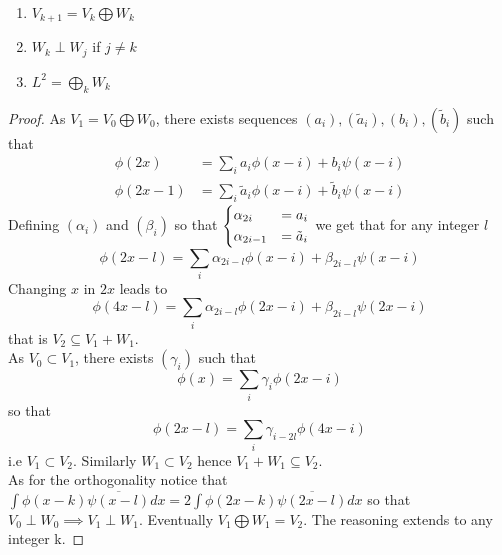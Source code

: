 \documentclass[a4paper, 11pt]{article}
\begin{document}
\begin{prop}{1}
  \begin{enumerate}
    \item $V_{k+1} = V_k \bigoplus W_k$
    \item $W_k \perp W_j$ if $j\neq k$
    \item $L^2 = \bigoplus_{k} W_k$ 
  \end{enumerate}
\end{prop}

\begin{proof}
  As $V_1 = V_0 \bigoplus W_0$, there exists sequences $(a_i), (\tilde{a}_i), (b_i), (\tilde{b}_i)$ such that
  \begin{align*}
    \phi(2x) &= \sum_{i} a_i \phi(x-i) + b_i \psi(x-i) \\
    \phi(2x-1) &= \sum_{i} \tilde{a}_i \phi(x-i) + \tilde{b}_i \psi(x-i)
  \end{align*}
  Defining $(\alpha_i)$ and $(\beta_i)$ so that $\begin{dcases} \alpha_{2i} &= a_{i} \\ \alpha_{2i-1} &= \tilde{a}_i 
  \end{dcases}$ we get that for any integer $l$
  \begin{equation}
    \phi(2x-l) = \sum_{i} \alpha_{2i-l} \phi(x-i) + \beta_{2i-l} \psi(x-i)
  \end{equation}
  Changing $x$ in $2x$ leads to 
  \begin{equation}
    \phi(4x-l) = \sum_{i} \alpha_{2i-l} \phi(2x-i) + \beta_{2i-l} \psi(2x-i)
  \end{equation}
  that is $V_2 \subseteq V_1 + W_1$. \\

  As $V_0 \subset V_1$, there exists $(\gamma_i)$ such that 
  \begin{equation*}
    \phi(x) = \sum_i \gamma_i \phi(2x-i)
  \end{equation*}
  so that 
  \begin{equation*}
    \phi(2x-l) = \sum_i \gamma_{i-2l} \phi(4x-i)
  \end{equation*}
  i.e $V_1 \subset V_2$. Similarly $W_1 \subset V_2$ hence $V_1 + W_1 \subseteq V_2$. \\

  As for the orthogonality notice that $\int \phi(x-k) \overline{\psi(x-l)} dx = 2 \int \phi(2x-k) \overline{\psi(2x-l)} 
dx$ so that $V_0 \perp W_0 \implies V_1 \perp W_1$. Eventually $V_1 \bigoplus W_1= V_2$. The reasoning extends to any 
integer k.  \end{proof}
\end{document}
